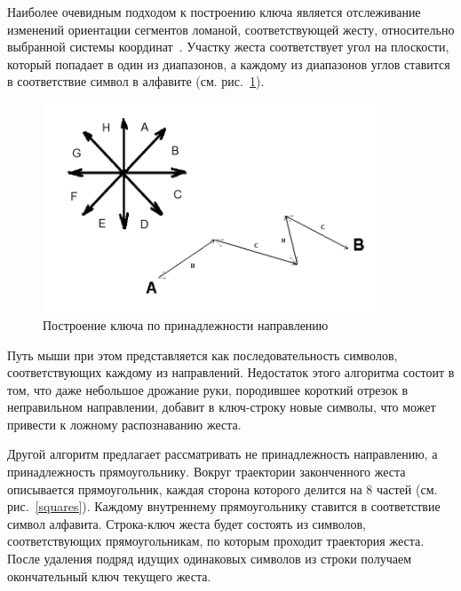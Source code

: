 \documentclass[a5paper]{article}
\begin{document}
Наиболее очевидным подходом к построению ключа является отслеживание изменений ориентации сегментов ломаной, соответствующей жесту, относительно выбранной системы координат~\cite{chaosAlgorithm}. Участку жеста соответствует угол на плоскости, который попадает в один из диапазонов, а каждому из диапазонов углов ставится в соответствие символ в алфавите (см. рис.~\ref{chaos}). 

\begin{figure} [ht]
  \begin{center}
    \includegraphics[width=0.9\textwidth, bb=0 0 804 498]{02-chaos.png}
    \caption{Построение ключа по принадлежности направлению}
    \label{chaos}
  \end{center}
\end{figure}

Путь мыши при этом представляется как последовательность символов, соответствующих каждому из направлений. Недостаток этого алгоритма состоит в том, что даже небольшое дрожание руки, породившее короткий отрезок в неправильном направлении, добавит в ключ-строку новые символы, что может привести к ложному распознаванию жеста.

Другой алгоритм предлагает рассматривать не принадлежность направлению, а принадлежность прямоугольнику. Вокруг траектории законченного жеста описывается прямоугольник, каждая сторона которого делится на 8 частей (см. рис.~\ref{squares}). Каждому внутреннему прямоугольнику ставится в соответствие символ алфавита. Строка-ключ жеста будет состоять из символов, соответствующих прямоугольникам, по которым проходит траектория жеста. После удаления подряд идущих одинаковых символов из строки получаем окончательный ключ текущего жеста. 
\end{document}
